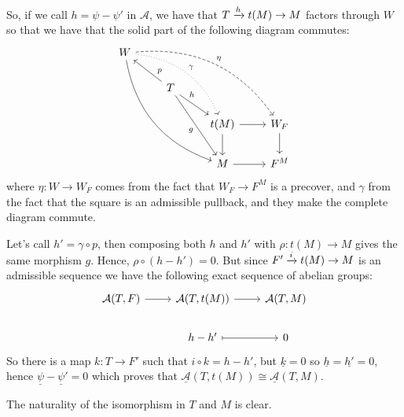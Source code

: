 So, if we call $h=\psi-\psi'$ in $\mathcal{A}$, we have that $T\xrightarrow{h} t(M) \to M$ factors through $W$
so that we have that the solid part of the following diagram commutes:
\begin{equation*}
  \begin{tikzcd}
    W\arrow[bend right]{dddrr}\arrow[bend left,dashed]{rrrdd}{\eta}
      \arrow[bend left,dotted]{ddrr}{\gamma}
      & & &\\
      & T\arrow{ul}[near start,']{p}\arrow{ddr}[']{g}\arrow{dr}[near start]{h}
        & & \\
      & & t(M)\arrow{d}\arrow{r}
          & W_F\arrow{d}\\
      & & M\arrow{r}
          & F^M
  \end{tikzcd}
\end{equation*}
where $\eta:W\to W_F$ comes from the fact that $W_F\to F^M$ is a precover, and $\gamma$ from the fact that
the square is an admissible pullback, and they make the complete diagram commute.

Let's call $h'=\gamma\circ p$, then composing both $h$ and $h'$ with $\rho:t(M)\to M$ gives the same morphism $g$.
Hence, $\rho\circ(h-h')=0$. But since $F'\xrightarrow{i} t(M) \to M$ is an admissible sequence we have the following exact
sequence of abelian groups:
\begin{equation*}
  \begin{tikzcd}
    \mathcal{A}(T,F)\arrow{r}
      & \mathcal{A}(T,t(M))\arrow{r}
        & \mathcal{A}(T,M)\\
      & h-h'\arrow[mapsto]{r}
        & 0
  \end{tikzcd}
\end{equation*}
So there is a map $k:T\to F'$ such that $i\circ k = h-h'$, but $\underline{k}=0$ so
$\underline{h}=\underline{h'}=0$, hence $\underline{\psi} - \underline{\psi}' =0$ which proves that
$\underline{\mathcal{A}}(T,t(M))\cong \underline{\mathcal{A}}(T,M)$.

The naturality of the isomorphism in $T$ and $M$ is clear.
